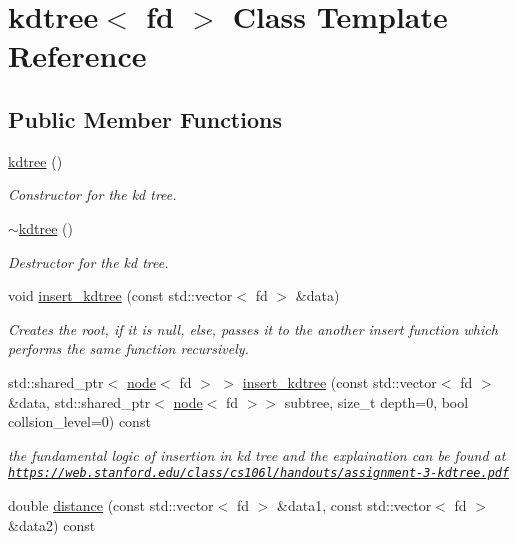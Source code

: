 \hypertarget{classkdtree}{\section{kdtree$<$ fd $>$ Class Template Reference}
\label{classkdtree}
}
\subsection*{Public Member Functions}
\begin{DoxyCompactItemize}
\item 
\hyperlink{classkdtree_a938fa159f9e1088db61c8fc34b2d31c9}{kdtree} ()
\begin{DoxyCompactList}\small\item\em Constructor for the kd tree. \end{DoxyCompactList}\item 
\hyperlink{classkdtree_aed5e97fa78a51ce22c83874f5ccfc91a}{$\sim$kdtree} ()
\begin{DoxyCompactList}\small\item\em Destructor for the kd tree. \end{DoxyCompactList}\item 
void \hyperlink{classkdtree_adb1d0dc87d051b2ee0372bc75d1c087f}{insert\-\_\-kdtree} (const std\-::vector$<$ fd $>$ \&data)
\begin{DoxyCompactList}\small\item\em Creates the root, if it is null, else, passes it to the another insert function which performs the same function recursively. \end{DoxyCompactList}\item 
std\-::shared\-\_\-ptr$<$ \hyperlink{classnode}{node}$<$ fd $>$ $>$ \hyperlink{classkdtree_ab979a4b809ba9d5361a08c769719f202}{insert\-\_\-kdtree} (const std\-::vector$<$ fd $>$ \&data, std\-::shared\-\_\-ptr$<$ \hyperlink{classnode}{node}$<$ fd $>$$>$ subtree, size\-\_\-t depth=0, bool collsion\-\_\-level=0) const 
\begin{DoxyCompactList}\small\item\em the fundamental logic of insertion in kd tree and the explaination can be found at \href{https://web.stanford.edu/class/cs106l/handouts/assignment-3-kdtree.pdf}{\tt https\-://web.\-stanford.\-edu/class/cs106l/handouts/assignment-\/3-\/kdtree.\-pdf} \end{DoxyCompactList}\item 
double \hyperlink{classkdtree_a117e8a22122b787152cc1f657324b5ab}{distance} (const std\-::vector$<$ fd $>$ \&data1, const std\-::vector$<$ fd $>$ \&data2) const 
$$
\end{DoxyCompactItemize}
